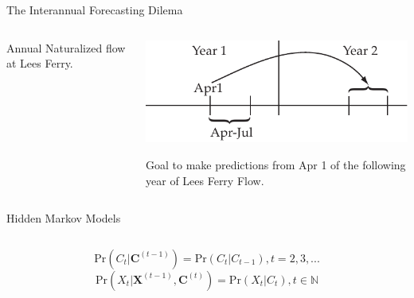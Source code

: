 \documentclass[final,x11names]{beamer}
\begin{document}
\begin{frame}{}
\begin{columns}
\begin{column}{.33\linewidth}
\begin{block}{\large The Interannual Forecasting Dilema}
\begin{columns}
\begin{column}{.48\textwidth}
					\centerline{Annual Naturalized flow at Lees Ferry. }

				\end{column}
				\begin{column}{.49\textwidth}

					\includegraphics[width=.9\textwidth]{figs/two-year.pdf}
					
					Goal to make predictions from Apr 1 of the following year of Lees Ferry Flow.
				\end{column}
			\end{columns}
			 
		\end{block}
		
		\begin{block}{Hidden Markov Models}
			\begin{columns}
				\begin{column}{.48\textwidth}
					$$\text{Pr}(C_t|\mathbf{C}^{(t-1)})=\text{Pr}(C_t|C_{t-1}), t=2,3,...$$
					$$\text{Pr}(X_t|\mathbf{X}^{(t-1)},\mathbf{C}^{(t)})=\text{Pr}(X_t|C_{t}), t\in	
					  \mathbb{N}$$
					  

\end{column}
\end{columns}
\end{block}
\end{column}
\end{columns}
\end{frame}
\end{document}
